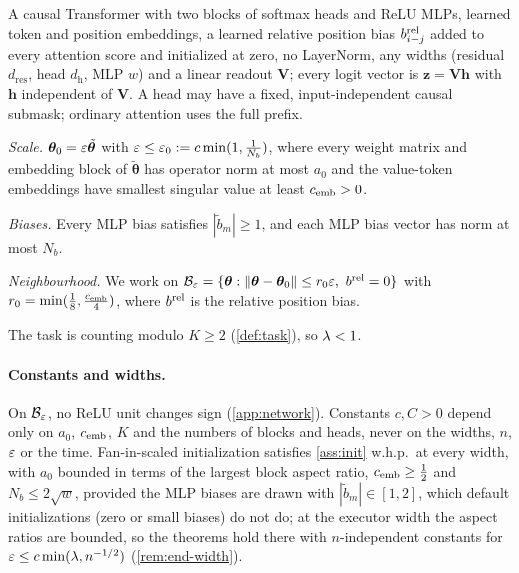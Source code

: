 \begin{assumption}[Architecture]
\label{ass:arch}
A causal Transformer with two blocks of softmax heads and ReLU MLPs, learned token and position
embeddings, a learned relative position bias $b^{\mathrm{rel}}_{i-j}$ added to every attention score and initialized at zero, no
LayerNorm, any widths (residual $d_{\mathrm{res}}$, head $d_{\mathrm h}$, MLP $w$) and a linear readout $\mathbf V$;
every logit vector is $\bm z=\mathbf V\bm h$ with $\bm h$ independent of $\mathbf V$. A head may have a fixed, input-independent causal submask;
ordinary attention uses the full prefix.
\end{assumption}

\begin{assumption}[Initialization]
\label{ass:init}
\emph{Scale.} $\bm\theta_0=\varepsilon\tilde{\bm\theta}$ with $\varepsilon\le\varepsilon_0:=c\min(1,\frac{1}{N_b})$, where every weight matrix and embedding block of $\tilde{\bm\theta}$ has operator norm
at most $a_0$ and the value-token embeddings have smallest singular value at least $c_{\mathrm{emb}}>0$.

\emph{Biases.} Every MLP bias satisfies $|\tilde b_m|\ge1$, and each MLP bias vector has norm at most $N_b$.

\emph{Neighbourhood.} We work on
$\initball=\{\bm\theta:\|\bm\theta-\bm\theta_0\|\le\ballradius\initscale,\ \brel=0\}$ with $r_0=\min(\frac{1}{8},\frac{c_{\mathrm{emb}}}{4})$, where $b^{\mathrm{rel}}$ is the
relative position bias.
\end{assumption}

\begin{assumption}[Task]
\label{ass:task}
The task is counting modulo $K\ge2$ (\cref{def:task}), so $\lambda<1$.
\end{assumption}

\paragraph{Constants and widths.} On $\mathcal B_{\varepsilon}$, no ReLU unit changes sign (\cref{app:network}). Constants $c,C>0$ depend only on $a_0$, $c_{\mathrm{emb}}$, $K$
and the numbers of blocks and heads, never on the widths, $n$, $\varepsilon$ or the time. Fan-in-scaled initialization
satisfies \cref{ass:init} w.h.p.\ at every width, with $a_0$ bounded in terms of the largest block aspect ratio,
$\embconst\ge\tfrac{1}{2}$ and $N_b\le2\sqrt w$, provided the MLP biases are drawn with $|\tilde b_m|\in[1,2]$, which default
initializations (zero or small biases) do not do; at the executor width the aspect ratios are bounded, so the theorems
hold there with $n$-independent constants for $\varepsilon\le c\min(\lambda,n^{-1/2})$ (\cref{rem:end-width}).

